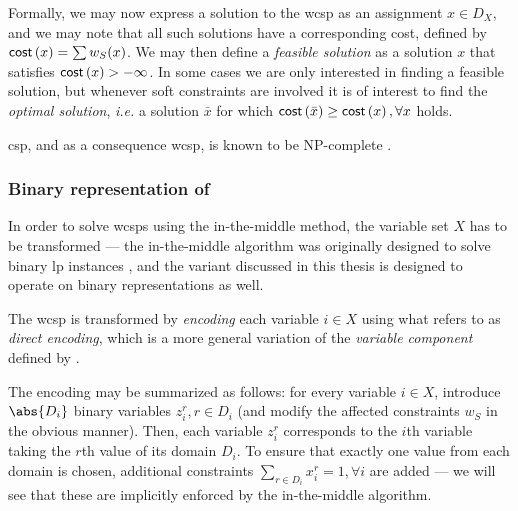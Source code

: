 Formally, we may now express a solution to the \gls{wcsp} as an assignment \({x} \in D_X\), and we may note that all such solutions have a corresponding cost, defined by \(\operatorname{\mathsf{cost}}\left({x}\right) = \sum w_S({x})\).
We may then define a \emph{feasible solution} as a solution \({x}\) that satisfies \(\operatorname{\mathsf{cost}}\left({x}\right) > -\infty\).
In some cases we are only interested in finding a feasible solution, but whenever soft constraints are involved it is of interest to find the \emph{optimal solution}, \emph{i.e.} a solution \(\bar{{x}}\) for which \(\operatorname{\mathsf{cost}}\left(\bar{{x}}\right) \geq \operatorname{\mathsf{cost}}\left({x}\right), \forall {x}\) holds.

\gls{csp}, and as a consequence \gls{wcsp}, is known to be NP-complete \parencite{Mackworth93}.

\subsubsection*{Binary representation of }
\label{term:direct-encoding}
In order to solve \glspl{wcsp} using the in-the-middle method, the variable set \(X\) has to be transformed --- the in-the-middle algorithm was originally designed to solve binary \gls{lp} instances \parencite{Wedelin95}, and the variant discussed in this thesis is designed to operate on binary representations as well.

The \gls{wcsp} is transformed by \emph{encoding} each variable \(i\in X\) using what \textcite[\pno~5]{Allouche14} refers to as \emph{direct encoding}, which is a more general variation of the \emph{variable component} defined by \textcite[\pno~5]{Wedelin08}.

The encoding may be summarized as follows: for every variable \(i\in X\), introduce \(\abs{D_i}\) binary variables \(z_i^r, r\in D_i\) (and modify the affected constraints \(w_S\) in the obvious manner). 
Then, each variable \(z_i^r\) corresponds to the \(i\)th variable taking the \(r\)th value of its domain \(D_i\).
To ensure that exactly one value from each domain is chosen, additional constraints \(\sum_{r\in D_i} x_i^r = 1, \forall i\) are added --- we will see that these are implicitly enforced by the in-the-middle algorithm.

